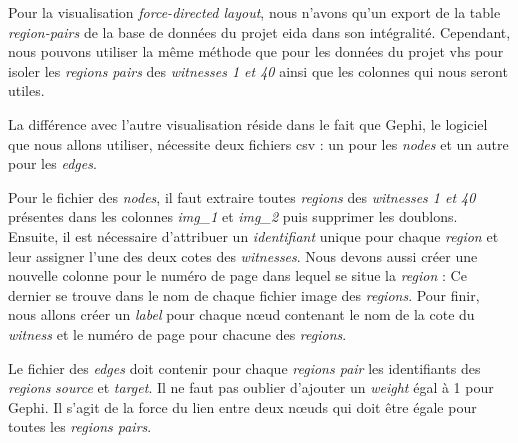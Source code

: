 Pour la visualisation \textit{force-directed layout}, nous n'avons qu'un export de la table \textit{region-pairs} de la base de données du projet \gls{eida} dans son intégralité. Cependant, nous pouvons utiliser la même méthode que pour les données du projet \gls{vhs} pour isoler les \textit{regions pairs} des \textit{witnesses 1 et 40} ainsi que les colonnes qui nous seront utiles. 

La différence avec l'autre visualisation réside dans le fait que Gephi, le logiciel que nous allons utiliser, nécessite deux fichiers \gls{csv} : un pour les \textit{nodes} et un autre pour les \textit{edges}. 

Pour le fichier des \textit{nodes}, il faut extraire toutes \textit{regions} des \textit{witnesses 1 et 40} présentes dans les colonnes \textit{img\_1} et \textit{img\_2} puis supprimer les doublons. Ensuite, il est nécessaire d'attribuer un \textit{identifiant} unique pour chaque \textit{region} et leur assigner l'une des deux cotes des \textit{witnesses}. Nous devons aussi créer une nouvelle colonne pour le numéro de page dans lequel se situe la \textit{region} : Ce dernier se trouve dans le nom de chaque fichier image des \textit{regions}. Pour finir, nous allons créer un \textit{label} pour chaque nœud contenant le nom de la cote du \textit{witness} et le numéro de page pour chacune des \textit{regions}.

Le fichier des \textit{edges} doit contenir pour chaque \textit{regions pair} les identifiants des \textit{regions} \textit{source} et \textit{target}. Il ne faut pas oublier d'ajouter un \textit{weight} égal à 1 pour Gephi. Il s'agit de la force du lien entre deux nœuds qui doit être égale pour toutes les \textit{regions pairs}.